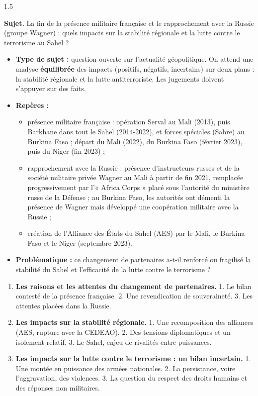 \documentclass[12pt]{article}
\begin{document}
\begin{spacing}{1.5}

\noindent\textbf{Sujet.} La fin de la présence militaire française et le rapprochement avec la Russie (groupe Wagner) : quels impacts sur la stabilité régionale et la lutte contre le terrorisme au Sahel ?


\begin{itemize}
\item \textbf{Type de sujet :} question ouverte sur l'actualité géopolitique. On attend une analyse \textbf{équilibrée} des impacts (positifs, négatifs, incertains) sur deux plans : la stabilité régionale et la lutte antiterroriste. Les jugements doivent s'appuyer sur des faits.
\item \textbf{Repères :}
  \begin{itemize}
  \item présence militaire française : opération Serval au Mali (2013), puis Barkhane dans tout le Sahel (2014-2022), et forces spéciales (Sabre) au Burkina Faso ; départ du Mali (2022), du Burkina Faso (février 2023), puis du Niger (fin 2023) ;
  \item rapprochement avec la Russie : présence d'instructeurs russes et de la société militaire privée Wagner au Mali à partir de fin 2021, remplacée progressivement par l'« Africa Corps » placé sous l'autorité du ministère russe de la Défense ; au Burkina Faso, les autorités ont démenti la présence de Wagner mais développé une coopération militaire avec la Russie ;
  \item création de l'Alliance des États du Sahel (AES) par le Mali, le Burkina Faso et le Niger (septembre 2023).
  \end{itemize}
\item \textbf{Problématique :} ce changement de partenaires a-t-il renforcé ou fragilisé la stabilité du Sahel et l'efficacité de la lutte contre le terrorisme ?
\end{itemize}


\begin{enumerate}
\item[I.] \textbf{Les raisons et les attentes du changement de partenaires.} 1. Le bilan contesté de la présence française. 2. Une revendication de souveraineté. 3. Les attentes placées dans la Russie.
\item[II.] \textbf{Les impacts sur la stabilité régionale.} 1. Une recomposition des alliances (AES, rupture avec la CEDEAO). 2. Des tensions diplomatiques et un isolement relatif. 3. Le Sahel, enjeu de rivalités entre puissances.
\item[III.] \textbf{Les impacts sur la lutte contre le terrorisme : un bilan incertain.} 1. Une montée en puissance des armées nationales. 2. La persistance, voire l'aggravation, des violences. 3. La question du respect des droits humains et des réponses non militaires.
\end{enumerate}


\end{spacing}
\end{document}
